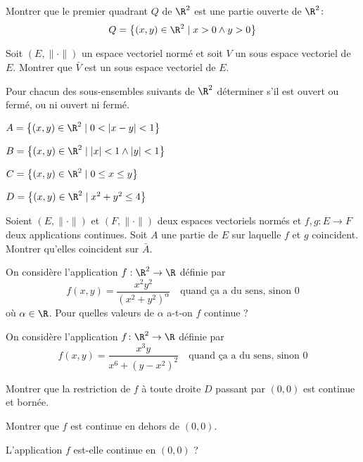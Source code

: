 \documentclass{report}
\begin{document}
\begin{exo}
    Montrer que le premier quadrant \(Q\) de \(\R^2\) est une partie ouverte de
    \(\R^2\colon\)\[Q=\left\{ \left(x,y\right)\in\R^2\mid x>0 \land y>0 \right\}\]
\end{exo}

\begin{exo}
    Soit \(\left(E, \|\cdot\|\right)\) un espace vectoriel normé et soit \(V\) un
    sous espace vectoriel de \(E\). Montrer que \(\bar{V}\) est un sous espace vectoriel
    de \(E\).
\end{exo}

\begin{exo}
    Pour chacun des sous-ensembles suivants de \(\R^2\) déterminer s'il est ouvert
    ou fermé, ou ni ouvert ni fermé.
    \begin{q}{1}
        \(A=\left\{ \left(x,y\right)\in\R^2\mid 0<|x-y|<1\right\} \)
    \end{q}
    \begin{q}{2}
        \(B=\left\{ \left(x,y\right)\in\R^2\mid |x|<1\land |y|<1\right\} \)
    \end{q}
    \begin{q}{3}
        \(C=\left\{ \left(x,y\right)\in\R^2\mid 0\leq x\leq y\right\} \)
    \end{q}
    \begin{q}{4}
        \(D=\left\{ \left(x,y\right)\in\R^2\mid x^2+y^2\leq 4\right\} \)
    \end{q}
\end{exo}

\begin{exo}
    Soient \(\left(E,\|\cdot\|\right)\) et \(\left(F,\|\cdot\|\right)\)
    deux espaces vectoriels normés et \(f,g\colon E\to F\) deux
    applications continues. Soit \(A\) une partie de \(E\) sur laquelle
    \(f\) et \(g\) coincident. Montrer qu'elles coincident sur \(\bar{A}\).
\end{exo}

\begin{exo}
    On considère l'application \(f:\R^2\to\R\) définie par
    \[f(x,y)=\frac{x^2y^2}{(x^2+y^2)^\alpha}\quad\text{quand ça a
    du sens, sinon } 0\] où \(\alpha\in\R\). Pour quelles valeurs de
    \(\alpha\) a-t-on \(f\) continue ?
\end{exo}

\begin{exo}
    On considère l'application \(f\colon\R^2\to\R\) définie par
    \[f(x,y)=\frac{x^3y}{x^6+(y-x^2)^2}\quad\text{quand ça a du sens,
    sinon }0\]
    \begin{q}{1}
        Montrer que la restriction de \(f\) à toute droite \(D\)
        passant par \((0,0)\) est continue et bornée.
    \end{q}
    \begin{q}{2}
        Montrer que \(f\) est continue en dehors de \((0,0)\).
    \end{q}
    \begin{q}{3}
        L'application \(f\) est-elle continue en \((0,0)\) ?
    \end{q}
\end{exo}
\end{document}
